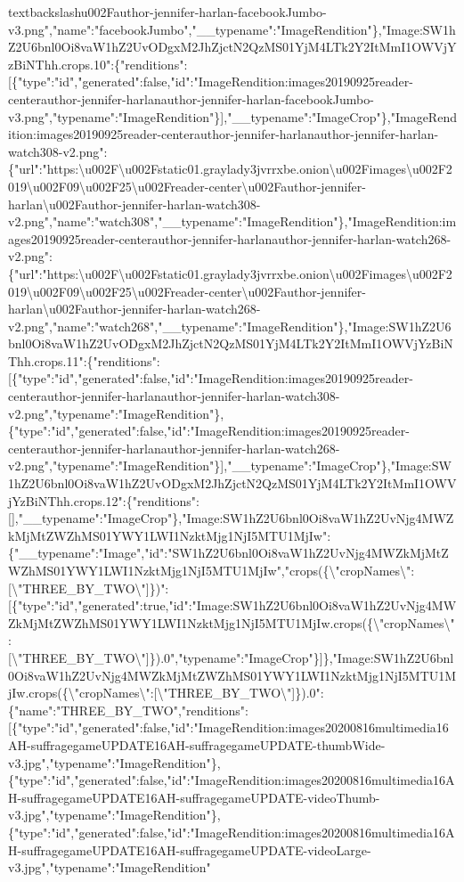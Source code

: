 textbackslash{}u002Fauthor-jennifer-harlan-facebookJumbo-v3.png","name":"facebookJumbo","\_\_typename":"ImageRendition"\},"Image:SW1hZ2U6bnl0Oi8vaW1hZ2UvODgxM2JhZjctN2QzMS01YjM4LTk2Y2ItMmI1OWVjYzBiNThh.crops.10":\{"renditions":{[}\{"type":"id","generated":false,"id":"ImageRendition:images20190925reader-centerauthor-jennifer-harlanauthor-jennifer-harlan-facebookJumbo-v3.png","typename":"ImageRendition"\}{]},"\_\_typename":"ImageCrop"\},"ImageRendition:images20190925reader-centerauthor-jennifer-harlanauthor-jennifer-harlan-watch308-v2.png":\{"url":"https:\textbackslash{}u002F\textbackslash{}u002Fstatic01.graylady3jvrrxbe.onion\textbackslash{}u002Fimages\textbackslash{}u002F2019\textbackslash{}u002F09\textbackslash{}u002F25\textbackslash{}u002Freader-center\textbackslash{}u002Fauthor-jennifer-harlan\textbackslash{}u002Fauthor-jennifer-harlan-watch308-v2.png","name":"watch308","\_\_typename":"ImageRendition"\},"ImageRendition:images20190925reader-centerauthor-jennifer-harlanauthor-jennifer-harlan-watch268-v2.png":\{"url":"https:\textbackslash{}u002F\textbackslash{}u002Fstatic01.graylady3jvrrxbe.onion\textbackslash{}u002Fimages\textbackslash{}u002F2019\textbackslash{}u002F09\textbackslash{}u002F25\textbackslash{}u002Freader-center\textbackslash{}u002Fauthor-jennifer-harlan\textbackslash{}u002Fauthor-jennifer-harlan-watch268-v2.png","name":"watch268","\_\_typename":"ImageRendition"\},"Image:SW1hZ2U6bnl0Oi8vaW1hZ2UvODgxM2JhZjctN2QzMS01YjM4LTk2Y2ItMmI1OWVjYzBiNThh.crops.11":\{"renditions":{[}\{"type":"id","generated":false,"id":"ImageRendition:images20190925reader-centerauthor-jennifer-harlanauthor-jennifer-harlan-watch308-v2.png","typename":"ImageRendition"\},\{"type":"id","generated":false,"id":"ImageRendition:images20190925reader-centerauthor-jennifer-harlanauthor-jennifer-harlan-watch268-v2.png","typename":"ImageRendition"\}{]},"\_\_typename":"ImageCrop"\},"Image:SW1hZ2U6bnl0Oi8vaW1hZ2UvODgxM2JhZjctN2QzMS01YjM4LTk2Y2ItMmI1OWVjYzBiNThh.crops.12":\{"renditions":{[}{]},"\_\_typename":"ImageCrop"\},"Image:SW1hZ2U6bnl0Oi8vaW1hZ2UvNjg4MWZkMjMtZWZhMS01YWY1LWI1NzktMjg1NjI5MTU1MjIw":\{"\_\_typename":"Image","id":"SW1hZ2U6bnl0Oi8vaW1hZ2UvNjg4MWZkMjMtZWZhMS01YWY1LWI1NzktMjg1NjI5MTU1MjIw","crops(\{\textbackslash{}"cropNames\textbackslash{}":{[}\textbackslash{}"THREE\_BY\_TWO\textbackslash{}"{]}\})":{[}\{"type":"id","generated":true,"id":"Image:SW1hZ2U6bnl0Oi8vaW1hZ2UvNjg4MWZkMjMtZWZhMS01YWY1LWI1NzktMjg1NjI5MTU1MjIw.crops(\{\textbackslash{}"cropNames\textbackslash{}":{[}\textbackslash{}"THREE\_BY\_TWO\textbackslash{}"{]}\}).0","typename":"ImageCrop"\}{]}\},"Image:SW1hZ2U6bnl0Oi8vaW1hZ2UvNjg4MWZkMjMtZWZhMS01YWY1LWI1NzktMjg1NjI5MTU1MjIw.crops(\{\textbackslash{}"cropNames\textbackslash{}":{[}\textbackslash{}"THREE\_BY\_TWO\textbackslash{}"{]}\}).0":\{"name":"THREE\_BY\_TWO","renditions":{[}\{"type":"id","generated":false,"id":"ImageRendition:images20200816multimedia16AH-suffragegameUPDATE16AH-suffragegameUPDATE-thumbWide-v3.jpg","typename":"ImageRendition"\},\{"type":"id","generated":false,"id":"ImageRendition:images20200816multimedia16AH-suffragegameUPDATE16AH-suffragegameUPDATE-videoThumb-v3.jpg","typename":"ImageRendition"\},\{"type":"id","generated":false,"id":"ImageRendition:images20200816multimedia16AH-suffragegameUPDATE16AH-suffragegameUPDATE-videoLarge-v3.jpg","typename":"ImageRendition"